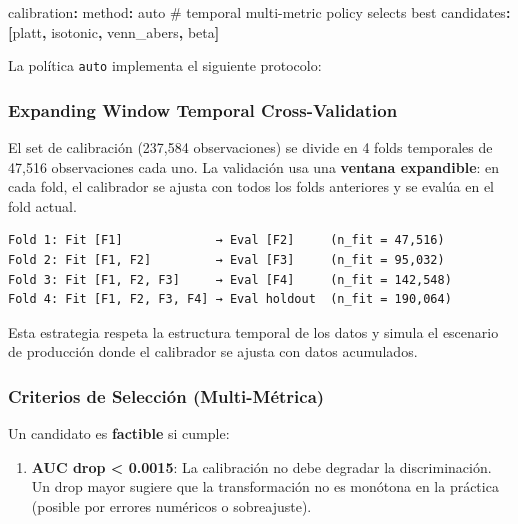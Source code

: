 \documentclass[
  spanish,
  11pt,
  letterpaper,
]{scrbook}
\newenvironment{Shaded}{\begin{snugshade}}{\end{snugshade}}
\newcommand{\AttributeTok}[1]{\textcolor[rgb]{0.40,0.45,0.13}{#1}}
\newcommand{\CommentTok}[1]{\textcolor[rgb]{0.37,0.37,0.37}{#1}}
\newcommand{\FunctionTok}[1]{\textcolor[rgb]{0.28,0.35,0.67}{#1}}
\newcommand{\KeywordTok}[1]{\textcolor[rgb]{0.00,0.23,0.31}{\textbf{#1}}}
\providecommand{\tightlist}{%
  \setlength{\itemsep}{0pt}\setlength{\parskip}{0pt}}
\theoremstyle{plain}
\theoremstyle{remark}
\begin{document}
\begin{Shaded}
\begin{Highlighting}[]
\FunctionTok{calibration}\KeywordTok{:}
\AttributeTok{  }\FunctionTok{method}\KeywordTok{:}\AttributeTok{ auto}\CommentTok{  \# temporal multi{-}metric policy selects best}
\AttributeTok{  }\FunctionTok{candidates}\KeywordTok{:}\AttributeTok{ }\KeywordTok{[}\AttributeTok{platt}\KeywordTok{,}\AttributeTok{ isotonic}\KeywordTok{,}\AttributeTok{ venn\_abers}\KeywordTok{,}\AttributeTok{ beta}\KeywordTok{]}
\end{Highlighting}
\end{Shaded}

La política \texttt{auto} implementa el siguiente protocolo:

\subsubsection{Expanding Window Temporal
Cross-Validation}\label{expanding-window-temporal-cross-validation}

El set de calibración (237,584 observaciones) se divide en 4 folds
temporales de 47,516 observaciones cada uno. La validación usa una
\textbf{ventana expandible}: en cada fold, el calibrador se ajusta con
todos los folds anteriores y se evalúa en el fold actual.

\begin{verbatim}
Fold 1: Fit [F1]             → Eval [F2]     (n_fit = 47,516)
Fold 2: Fit [F1, F2]         → Eval [F3]     (n_fit = 95,032)
Fold 3: Fit [F1, F2, F3]     → Eval [F4]     (n_fit = 142,548)
Fold 4: Fit [F1, F2, F3, F4] → Eval holdout  (n_fit = 190,064)
\end{verbatim}

Esta estrategia respeta la estructura temporal de los datos y simula el
escenario de producción donde el calibrador se ajusta con datos
acumulados.

\subsubsection{Criterios de Selección
(Multi-Métrica)}\label{criterios-de-selecciuxf3n-multi-muxe9trica}

Un candidato es \textbf{factible} si cumple:

\begin{enumerate}
\def\labelenumi{\arabic{enumi}.}
\tightlist
\item
  \textbf{AUC drop \textless{} 0.0015}: La calibración no debe degradar
  la discriminación. Un drop mayor sugiere que la transformación no es
  monótona en la práctica (posible por errores numéricos o sobreajuste).
\end{enumerate}
\end{document}
